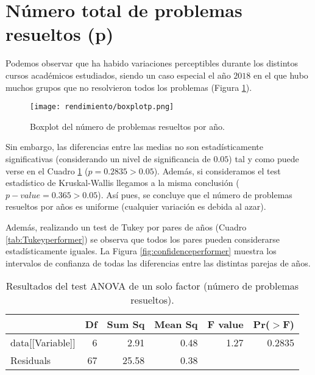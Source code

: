 \section{Número total de problemas resueltos (p)}

Podemos observar que ha habido variaciones perceptibles durante los distintos cursos académicos estudiados, siendo un caso especial el año $2018$ en el que hubo muchos grupos que no resolvieron todos los problemas (Figura \ref{fig:boxplotperformer}).

\begin{figure}[H]
    \centering
    \texttt{[image: rendimiento/boxplotp.png]}
    \caption{Boxplot del número de problemas resueltos por año.}
    \label{fig:boxplotperformer}
\end{figure}

Sin embargo, las diferencias entre las medias no son estadísticamente significativas (considerando un nivel de significancia de $0.05$) tal y como puede verse en el Cuadro \ref{tab:ANOVAperformer} ($p = 0.2835 > 0.05$). Además, si consideramos el test estadístico de Kruskal-Wallis llegamos a la misma conclusión ($p-value = 0.365 > 0.05$). Así pues, se concluye que el número de problemas resueltos por años es uniforme (cualquier variación es debida al azar).

Además, realizando un test de Tukey por pares de años (Cuadro \ref{tab:Tukeyperformer}) se observa que todos los pares pueden considerarse estadísticamente iguales. La Figura \ref{fig:confidenceperformer} muestra los intervalos de confianza de todas las diferencias entre las distintas parejas de años.

\begin{table}[H]
\centering
\caption{Resultados del test ANOVA de un solo factor (número de problemas resueltos).}
\label{tab:ANOVAperformer}
\begin{tabular}{lrrrrr}
  \hline
 & Df & Sum Sq & Mean Sq & F value & Pr($>$F) \\ 
  \hline
data[[Variable]] & 6 & 2.91 & 0.48 & 1.27 & 0.2835 \\ 
  Residuals            & 67 & 25.58 & 0.38 &  &  \\ 
   \hline
\end{tabular}
\end{table}

